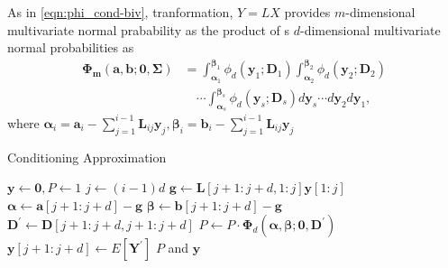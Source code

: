 \begin{frame}
	As in \eqref{eqn:phi_cond-biv}, tranformation, $Y=LX$ provides $m$-dimensional multivariate normal prabability as the product of s $d$-dimensional multivariate normal probabilities as
		\begin{align}\label{eqn::phi_cond-ddim}
		\boldsymbol{\Phi_m}(\mathbf{a},\mathbf{b};\mathbf{0},\boldsymbol{\Sigma})
		&=\int_{\mathbf{\alpha}_1}^{\mathbf{\beta}_1}\phi_d(\mathbf{y}_1;\mathbf{D}_1)\int_{\mathbf{\alpha}_2}^{\mathbf{\beta}_2}\phi_d(\mathbf{y}_2;\mathbf{D}_2) \\
		&\quad \cdots\int_{\mathbf{\alpha}_s}^{\mathbf{\beta}_s}\phi_d(\mathbf{y}_s;\mathbf{D}_s)d\mathbf{y}_s\cdots d\mathbf{y}_2d\mathbf{y}_1,
		\end{align}
		where $\boldsymbol{\alpha}_i=\mathbf{a}_i-\sum_{j=1}^{i-1}\mathbf{L}_{ij}\mathbf{y}_j, \boldsymbol{\beta}_i=\mathbf{b}_i-\sum_{j=1}^{i-1}\mathbf{L}_{ij}\mathbf{y}_j$
\end{frame}

\begin{frame}{Conditioning Approximation}
\begin{algorithm}[H]
	\caption{d-dimensional conditioning algorithm}
	\begin{algorithmic}[1]
		\footnotesize
		\State $\mathbf{y}\leftarrow\mathbf{0},P\leftarrow1$
		\State $j\leftarrow(i-1)d$
		\State $\mathbf{g}\leftarrow\mathbf{L}[j+1:j+d,1:j]\mathbf{y}[1:j]$
		\State $\boldsymbol{\alpha}\leftarrow\mathbf{a}[j+1:j+d]-\mathbf{g}$
		\State $\boldsymbol{\beta}\leftarrow\mathbf{b}[j+1:j+d]-\mathbf{g}$
		\State $\mathbf{D}^\prime\leftarrow\mathbf{D}[j+1:j+d,j+1:j+d]$
		\State $P\leftarrow P\cdot\boldsymbol{\Phi}_d(\boldsymbol{\alpha},\boldsymbol{\beta};\mathbf{0},\mathbf{D}^\prime)$
		\State $\mathbf{y}[j+1:j+d]\leftarrow E[\mathbf{Y}^\prime]$
		\EndFor
		\State\Return $P$ and $\mathbf{y}$
		\EndProcedure
	\end{algorithmic}\label{alg:CMVN}
\end{algorithm}
\end{frame}

